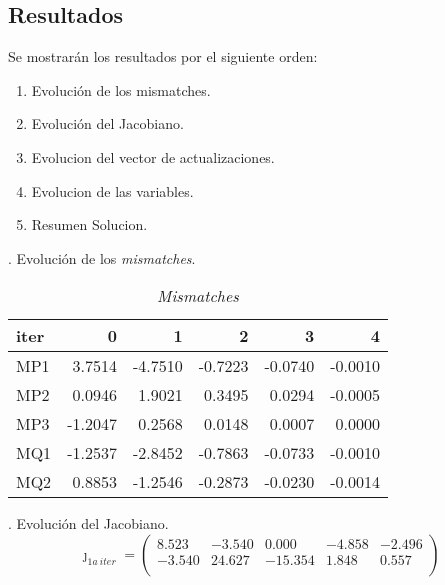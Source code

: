 \documentclass[a4paper,10pt,titlepage,oneside]{article}
\begin{document}
{\subsection{Resultados}
Se mostrarán los resultados por el siguiente orden:
\begin{enumerate}
    \item Evolución de los mismatches.
    \item Evolución del Jacobiano.
    \item Evolucion del vector de actualizaciones.
    \item Evolucion de las variables.
    \item Resumen Solucion.
\end{enumerate}
. Evolución de los \textit{mismatches}.\\
\begin{table}[htbp]
        \centering
    \begin{tabular}[t]{l r r r r r} 
        iter    &   0  &     1  &     2 &      3    &   4 \\
        \hline
        \rowcolor[gray]{0.8} MP1 &  3.7514 &-4.7510& -0.7223 &-0.0740 &-0.0010\\
        \hline
        \rowcolor[gray]{0.6} MP2  & 0.0946 & 1.9021 & 0.3495 & 0.0294 &-0.0005\\
        \hline
        \rowcolor[gray]{0.8} MP3  &-1.2047 & 0.2568 & 0.0148 & 0.0007 & 0.0000\\
        \hline
        \rowcolor[gray]{0.6} MQ1  &-1.2537 &-2.8452 &-0.7863 &-0.0733 &-0.0010\\
        \hline
        \rowcolor[gray]{0.8} MQ2  & 0.8853& -1.2546 &-0.2873& -0.0230 &-0.0014\\
        \hline
    \end{tabular}
   \caption{\textit{Mismatches}}
\end{table}

. Evolución del Jacobiano.
\begin{equation*}
 \jmath_{1a\:iter}=
    \begin{pmatrix} 
        
           8.523  & -3.540  &   0.000  &  -4.858  &  -2.496\\
        
        -3.540  &  24.627  & -15.354  &   1.848   &  0.557\\
        

\end{pmatrix}
\end{equation*}}
\end{document}
